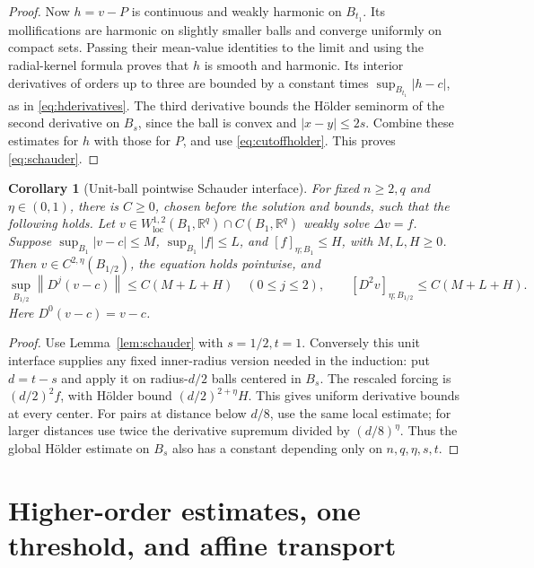 \documentclass[11pt,a4paper]{article}
\numberwithin{equation}{section}
\newtheorem{corollary}[theorem]{Corollary}
\theoremstyle{definition}
\theoremstyle{remark}
\newcommand{\R}{\mathbb R}
\newcommand{\norm}[1]{\left\lVert#1\right\rVert}
\begin{document}
\begin{proof}
Now \(h=v-P\) is continuous and weakly harmonic on \(B_{t_1}\).
Its mollifications are harmonic on slightly smaller balls and converge
uniformly on compact sets. Passing their mean-value identities to the
limit and using the radial-kernel formula proves that \(h\) is smooth
and harmonic. Its interior derivatives of orders up to three are bounded
by a constant times \(\sup_{B_{t_1}}|h-c|\), as in
\eqref{eq:hderivatives}. The third derivative bounds the H\"older
seminorm of the second derivative on \(B_s\), since the ball is convex
and \(|x-y|\le2s\). Combine these estimates for \(h\) with those for
\(P\), and use \eqref{eq:cutoffholder}. This proves \eqref{eq:schauder}.
\end{proof}

\begin{corollary}[Unit-ball pointwise Schauder interface]
\label{cor:unitschauder}
For fixed \(n\ge2,q\) and \(\eta\in(0,1)\), there is \(C\ge0\),
chosen before the solution and bounds, such that the following holds.
Let \(v\in W^{1,2}_{\mathrm{loc}}(B_1,\R^q)\cap C(B_1,\R^q)\)
weakly solve \(\Delta v=f\). Suppose
\(\sup_{B_1}|v-c|\le M\), \(\sup_{B_1}|f|\le L\), and
\([f]_{\eta;B_1}\le H\), with \(M,L,H\ge0\). Then
\(v\in C^{2,\eta}(B_{1/2})\), the equation holds pointwise, and
\[
 \sup_{B_{1/2}}\norm{D^j(v-c)}\le C(M+L+H)\quad(0\le j\le2),
 \qquad [D^2v]_{\eta;B_{1/2}}\le C(M+L+H).
\]
Here \(D^0(v-c)=v-c\).
\end{corollary}
\begin{proof}
Use Lemma~\ref{lem:schauder} with \(s=1/2,t=1\). Conversely this unit
interface supplies any fixed inner-radius version needed in the induction:
put \(d=t-s\) and apply it on radius-\(d/2\) balls centered in \(B_s\).
The rescaled forcing is \((d/2)^2f\), with H\"older bound
\((d/2)^{2+\eta}H\). This gives uniform derivative bounds at every
center. For pairs at distance below \(d/8\), use the same local estimate;
for larger distances use twice the derivative supremum divided by
\((d/8)^\eta\). Thus the global H\"older estimate on \(B_s\) also has
a constant depending only on \(n,q,\eta,s,t\).
\end{proof}

\section{Higher-order estimates, one threshold, and affine transport}
\label{sec:higher}
\end{document}
